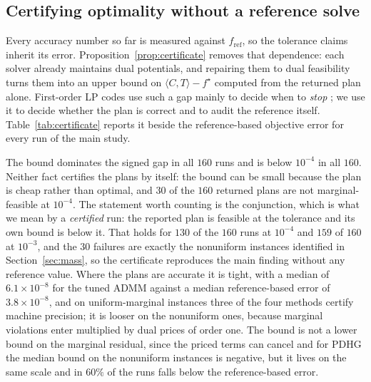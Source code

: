 \documentclass{article}
\newcommand{\Tol}[1]{10^{-#1}}
\begin{document}
\subsection{Certifying optimality without a reference solve}
\label{sec:certificate}

Every accuracy number so far is measured against $f_{\mathrm{ref}}$, so the tolerance
claims inherit its error. Proposition~\ref{prop:certificate} removes that dependence: each
solver already maintains dual potentials, and repairing them to dual feasibility turns
them into an upper bound on $\langle C,T\rangle-f^\star$ computed from the returned plan
alone. First-order LP codes use such a gap mainly to decide when to \emph{stop}
\citep{applegate2021pdlp}; we use it to decide whether the plan is correct and to audit the
reference itself. Table~\ref{tab:certificate} reports it beside the reference-based
objective error for every run of the main study.

The bound dominates the signed gap in all $160$ runs and is below $\Tol{4}$ in all $160$.
Neither fact certifies the plans by itself: the bound can be small because the plan is cheap
rather than optimal, and $30$ of the $160$ returned plans are not marginal-feasible at
$\Tol{4}$. The statement worth counting is the conjunction, which is what we mean by a
\emph{certified} run: the reported plan is feasible at the tolerance and its own bound is
below it. That holds for $130$ of the $160$ runs at $\Tol{4}$ and $159$ of $160$ at
$\Tol{3}$, and the $30$ failures are exactly the nonuniform instances identified in
Section~\ref{sec:mass}, so the certificate reproduces the main finding without any reference
value. Where the plans are accurate it is tight, with a median of $6.1\times\Tol{8}$ for the
tuned ADMM against a median reference-based error of $3.8\times\Tol{8}$, and on
uniform-marginal instances three of the four methods certify machine precision; it is looser
on the nonuniform ones, because marginal violations enter multiplied by dual prices of order
one. The bound is not a lower bound on the marginal residual, since the priced terms can
cancel and for PDHG the median bound on the nonuniform instances is negative, but it lives on
the same scale and in $60\%$ of the runs falls below the reference-based error.
\end{document}
